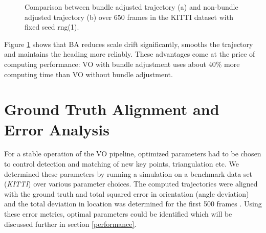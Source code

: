 \begin{figure}[htp]
	\centering
	
	\hspace{2cm}
	\caption{Comparison between bundle adjusted trajectory (a) and non-bundle adjusted trajectory (b) over 650 frames in the KITTI dataset with fixed seed rng(1).}
	\label{fig:BAeffect}
\end{figure}


Figure \ref{fig:BAeffect} shows that BA reduces scale drift significantly, smooths the trajectory and maintains the heading more reliably. These advantages come at the price of computing performance: VO with bundle adjustment uses about 40\% more computing time than VO without bundle adjustment.

\section{Ground Truth Alignment and Error Analysis}
\label{simulation}

For a stable operation of the VO pipeline, optimized parameters had to be chosen to control detection and matching of new key points, triangulation etc. 
We determined these parameters by running a simulation  on a benchmark data set (\emph{KITTI}) over various parameter choices. The computed trajectories were aligned with the ground truth and total squared error in orientation (angle deviation) and the total deviation in location was determined for the first 500 frames . Using these error metrics, optimal parameters could be identified which will be discussed further in section \ref{performance}.